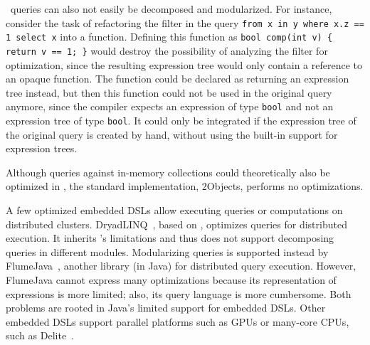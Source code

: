 \LINQ\ queries can also not easily be decomposed and modularized. For instance, consider the task of refactoring the filter in the query {\tt from x in y where x.z == 1 select x}
into a function. Defining this function as {\tt bool comp(int v) \{ return v == 1; \}} would destroy the possibility of analyzing the filter for optimization, since
the resulting expression tree would only contain a reference to an opaque function. The function could be declared as returning an expression tree instead, but then
this function could not be used in the original query anymore, since the compiler expects an expression of type {\tt bool} and not an expression tree of type {\tt bool}.
It could only be integrated if the expression tree of the original query is created by hand, without using the built-in support for expression trees.



Although queries against in-memory collections could theoretically also be optimized in \LINQ, the standard implementation, {\LINQ}2Objects, performs no optimizations. 

A few optimized embedded DSLs allow executing queries or computations on distributed clusters.
DryadLINQ~\citep{Yu08}, based on \LINQ, optimizes queries for distributed
execution. It inherits \LINQ's limitations and thus does not support decomposing queries in different modules.
Modularizing queries is supported instead by FlumeJava~\citep{Chambers10},
another library (in Java) for distributed query execution.
However, FlumeJava cannot express many optimizations because its representation
of expressions is more
limited; also, its query language is more cumbersome. Both problems are rooted
in Java's limited support for embedded DSLs.
Other embedded DSLs support parallel platforms such as GPUs or many-core CPUs,
such as Delite~\citep{Rompf13}.

